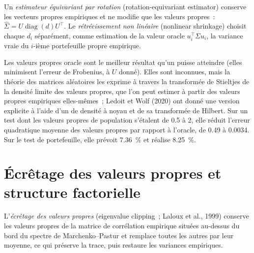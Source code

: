 \begin{definition}\label{def:qm:covariance-estimation-and-random-matrices:nonlinear}
Un \emph{estimateur équivariant par rotation} (rotation-equivariant estimator) conserve les vecteurs propres empiriques et ne modifie que les valeurs propres~: $\hat\Sigma = U\operatorname{diag}(d)U^\top$.
Le \emph{rétrécissement non linéaire} (nonlinear shrinkage) choisit chaque $d_i$ séparément, comme estimation de la valeur oracle $u_i^\top\Sigma u_i$, la variance vraie du $i$-ième
portefeuille propre empirique.
\end{definition}

Les valeurs propres oracle sont le meilleur résultat qu'un  puisse atteindre (elles minimisent l'erreur de Frobenius, à $U$ donné). Elles sont inconnues, mais la théorie des matrices aléatoires les exprime
à travers la transformée de Stieltjes de la densité limite des valeurs propres, que l'on peut estimer à partir des valeurs propres empiriques elles-mêmes~; Ledoit et Wolf (2020) ont donné une
version explicite à l'aide d'un  de densité à noyau et de sa transformée de Hilbert. Sur un test dont les valeurs propres de population s'étalent de 0.5 à 2, elle réduit l'erreur quadratique moyenne des valeurs propres
par rapport à l'oracle, de 0.49 à 0.0034. Sur le test de portefeuille, elle prévoit 7.36~\% et réalise 8.25~\%.

\section{Écrêtage des valeurs propres et structure factorielle}

\begin{definition}\label{def:qm:covariance-estimation-and-random-matrices:clip}
L'\emph{écrêtage des valeurs propres} (eigenvalue clipping~; Laloux et al., 1999) conserve les valeurs propres de la matrice de corrélation empirique situées au-dessus du bord du spectre de Marchenko--Pastur et remplace toutes
les autres par leur moyenne, ce qui préserve la trace, puis restaure les variances empiriques.
\end{definition}

